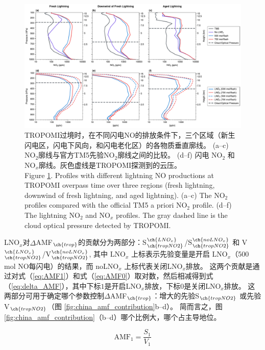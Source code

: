 \begin{figure}[!htbp]
    \includegraphics[width=17cm]{./figures/china_nox_profile.pdf}
    \caption{
    TROPOMI过境时，在不同闪电NO的排放条件下，三个区域（新生闪电区，闪电下风向，和闪电老化区）的各物质垂直廓线。
     (a--c) NO$_2$廓线与官方TM5先验NO$_2$廓线之间的比较。
     (d--f) 闪电 NO$_2$ 和 NO$_x$廓线。灰色虚线是TROPOMI探测到的云压。\\
     Figure \ref{fig:china_nox_profile}. Profiles with different lightning NO productions at TROPOMI overpass time over three regions (fresh lightning, downwind of fresh lightning, and aged lightning).
    (a--c) The NO$_2$ profiles compared with the official TM5 a priori NO$_2$ profile.
    (d--f) The lightning NO$_2$ and NO$_x$ profiles.
    The gray dashed line is the cloud optical pressure detected by TROPOMI.
    }
    \label{fig:china_nox_profile}
\end{figure}


LNO$_x$对$\Delta$AMF$_{\ch{trop}}$的贡献分为两部分：S$^{\ch{LNO_x}}_{\ch{tropNO2}}$/S$^{\ch{noLNO_x}}_{\ch{tropNO2}}$ 和 V$^{\ch{LNO_x}}_{\ch{tropNO2}}$/V$^{\ch{noLNO_x}}_{\ch{tropNO2}}$,
其中 LNO$_x$ 上标表示先验变量是开启 LNO$_x$（500 mol NO每闪电）的结果，而 noLNO$_x$ 上标代表关闭LNO$_x$排放。
这两个贡献是通过对式（\ref{eq:AMF1}）和式（\ref{eq:AMF0}）取对数，然后相减得到式（\ref{eq:delta_AMF}），其中下标$1$是开启LNO$_x$排放，下标$0$是关闭LNO$_x$排放。
这两部分可用于确定哪个参数控制$\Delta$AMF$_{\ch{trop}}$：增大的先验S$_{\ch{tropNO2}}$ 或先验 V$_{\ch{tropNO2}}$（图 \ref{fig:china_amf_contribution}b--d）。
简而言之，图 \ref{fig:china_amf_contribution}（b--d）哪个比例大，哪个占主导地位。

\begin{equation} \label{eq:AMF1}
\textrm{AMF}_1 = \frac{S_1}{V_1}
\end{equation}

